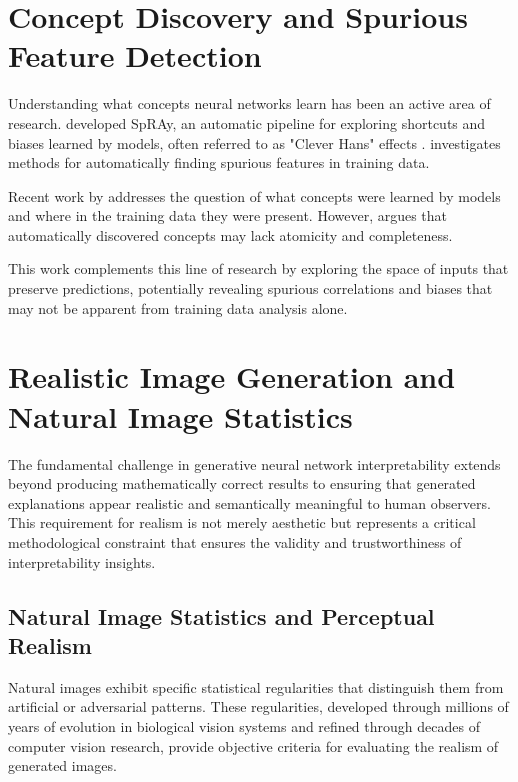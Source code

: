 \section{Concept Discovery and Spurious Feature Detection}

Understanding what concepts neural networks learn has been an active area of research. \cite{Lapuschkin_2019} developed SpRAy, an automatic pipeline for exploring shortcuts and biases learned by models, often referred to as "Clever Hans" effects \citep{pfungst1911cleverHans}. \citet{neuhaus2023spuriousfeatureslargescale} investigates methods for automatically finding spurious features in training data.

Recent work by \citet{dreyer2025mechanisticunderstandingvalidationlarge} addresses the question of what concepts were learned by models and where in the training data they were present. However, \citep{leask2025sparse} argues that automatically discovered concepts may lack atomicity and completeness.

This work complements this line of research by exploring the space of inputs that preserve predictions, potentially revealing spurious correlations and biases that may not be apparent from training data analysis alone.

\section{Realistic Image Generation and Natural Image Statistics}

The fundamental challenge in generative neural network interpretability extends beyond producing mathematically correct results to ensuring that generated explanations appear realistic and semantically meaningful to human observers. This requirement for realism is not merely aesthetic but represents a critical methodological constraint that ensures the validity and trustworthiness of interpretability insights.

\subsection{Natural Image Statistics and Perceptual Realism}

Natural images exhibit specific statistical regularities that distinguish them from artificial or adversarial patterns. These regularities, developed through millions of years of evolution in biological vision systems and refined through decades of computer vision research, provide objective criteria for evaluating the realism of generated images.

